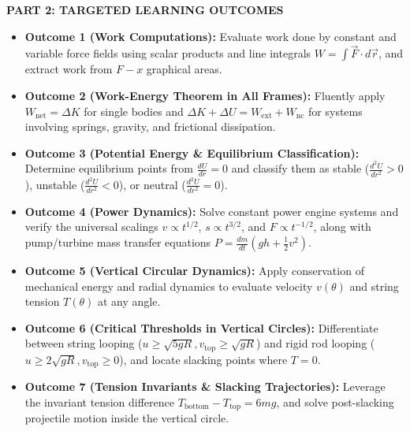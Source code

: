 \documentclass[11pt,a4paper]{article}
\begin{document}
\begin{tcolorbox}[sectionbanner]
  {\large \textbf{\textsf{PART 2: TARGETED LEARNING OUTCOMES}}}
\end{tcolorbox}
\vspace{3pt}

\begin{itemize}[leftmargin=18pt,itemsep=2.5pt,topsep=1pt]
  \item[$\square$] \textbf{\textcolor{primaryDark}{Outcome 1 (Work Computations):}} Evaluate work done by constant and variable force fields using scalar products and line integrals $W = \int \vec{F} \cdot d\vec{r}$, and extract work from $F-x$ graphical areas.
  \item[$\square$] \textbf{\textcolor{primaryDark}{Outcome 2 (Work-Energy Theorem in All Frames):}} Fluently apply $W_{\text{net}} = \Delta K$ for single bodies and $\Delta K + \Delta U = W_{\text{ext}} + W_{\text{nc}}$ for systems involving springs, gravity, and frictional dissipation.
  \item[$\square$] \textbf{\textcolor{primaryDark}{Outcome 3 (Potential Energy \& Equilibrium Classification):}} Determine equilibrium points from $\frac{dU}{dr} = 0$ and classify them as stable ($\frac{d^2 U}{dr^2} > 0$), unstable ($\frac{d^2 U}{dr^2} < 0$), or neutral ($\frac{d^2 U}{dr^2} = 0$).
  \item[$\square$] \textbf{\textcolor{primaryDark}{Outcome 4 (Power Dynamics):}} Solve constant power engine systems and verify the universal scalings $v \propto t^{1/2}$, $s \propto t^{3/2}$, and $F \propto t^{-1/2}$, along with pump/turbine mass transfer equations $P = \frac{dm}{dt}(gh + \frac{1}{2}v^2)$.
  \item[$\square$] \textbf{\textcolor{primaryDark}{Outcome 5 (Vertical Circular Dynamics):}} Apply conservation of mechanical energy and radial dynamics to evaluate velocity $v(\theta)$ and string tension $T(\theta)$ at any angle.
  \item[$\square$] \textbf{\textcolor{primaryDark}{Outcome 6 (Critical Thresholds in Vertical Circles):}} Differentiate between string looping ($u \ge \sqrt{5gR}, v_{\text{top}} \ge \sqrt{gR}$) and rigid rod looping ($u \ge 2\sqrt{gR}, v_{\text{top}} \ge 0$), and locate slacking points where $T=0$.
  \item[$\square$] \textbf{\textcolor{primaryDark}{Outcome 7 (Tension Invariants \& Slacking Trajectories):}} Leverage the invariant tension difference $T_{\text{bottom}} - T_{\text{top}} = 6mg$, and solve post-slacking projectile motion inside the vertical circle.
\end{itemize}
\end{document}
